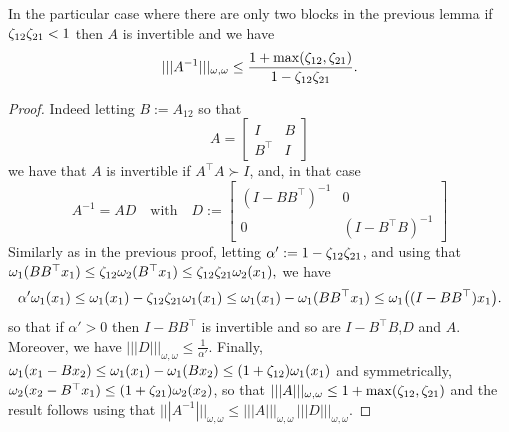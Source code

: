 \documentclass{article}
\begin{document}
\begin{lemma}
\label{lem:two}
In the particular case where there are only two blocks in the previous lemma if $\zeta_{12}\zeta_{21}<1$ then $A$ is invertible and we have $$|||A^{-1}|||_{\omega,\omega} \leq \frac{1+\max(\zeta_{12},\zeta_{21})}{1-\zeta_{12}\zeta_{21}}.$$
\end{lemma}
\begin{proof}
Indeed letting $B:=A_{12}$ so that 
$$A=
\begin{bmatrix}
I & B\\
B^\top & I
\end{bmatrix}
$$
we have that $A$ is invertible if $A^\top A \succ I$, and, in that case
$$A^{-1}=A D \quad \text{with} \quad D:= 
\begin{bmatrix}
(I-BB^\top)^{-1} & 0\\
0 & (I-B^\top B)^{-1}
\end{bmatrix}
$$
Similarly as in the previous proof, letting $\alpha':=1-\zeta_{12} \zeta_{21}$, and using that $\omega_1(BB^\top x_1) \leq \zeta_{12} \omega_2(B^\top x_1) \leq  \zeta_{12} \zeta_{21} \omega_2(x_1),$ 
we have
$$\alpha' \omega_1(x_1) \leq \omega_1(x_1)- \zeta_{12} \zeta_{21} \omega_1(x_1) \leq \omega_1(x_1)- \omega_1(BB^\top x_1) \leq \omega_1 \big ( (I-BB^\top) x_1 \big ).$$
so that if $\alpha'>0$ then $I-BB^\top$ is invertible and so are  $I-B^\top B$,$D$ and $A$. Moreover, we have $|||D|||_{\omega,\omega} \leq \frac{1}{\alpha'}$. Finally, $\omega_1(x_1-Bx_2)\leq \omega_1(x_1)-\omega_1(Bx_2) \leq (1+\zeta_{12}) \omega_1(x_1)$ and symmetrically, $\omega_2(x_2-B^\top x_1) \leq (1+\zeta_{21}) \omega_2(x_2)$, so that $|||A|||_{\omega,\omega} \leq 1+\max(\zeta_{12},\zeta_{21})$ and the result follows using that $|||A^{-1}|||_{\omega,\omega} \leq |||A|||_{\omega,\omega} \, |||D|||_{\omega,\omega}$.
\end{proof}
\end{document}
